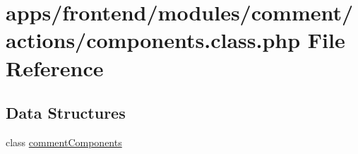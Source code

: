 \hypertarget{frontend_2modules_2comment_2actions_2components_8class_8php}{\section{apps/frontend/modules/comment/actions/components.class.\-php File Reference}
\label{frontend_2modules_2comment_2actions_2components_8class_8php}
}
\subsection*{Data Structures}
\begin{DoxyCompactItemize}
\item 
class \hyperlink{classcomment_components}{comment\-Components}
\end{DoxyCompactItemize}
